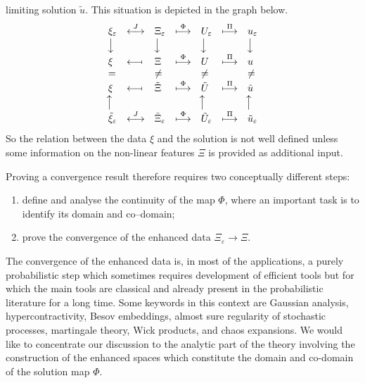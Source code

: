 \documentclass[a4paper, 11pt]{article}
\newcommand{\longdownarrow}{{\mbox{\rotatebox[origin=c]{-90}{$\longrightarrow$}}}}
\newcommand{\longuparrow}{{\mbox{\rotatebox[origin=c]{90}{$\longrightarrow$}}}}
\begin{document}
limiting solution $\tilde{u}$. This situation is depicted in the graph below.
\[ \begin{array}{lllllll}
     \xi_{\varepsilon} & \overset{J}{\longleftrightarrow} & \Xi_{\varepsilon}
     & \overset{\Phi}{\longmapsto} & U_{\varepsilon} & \overset{\Pi}{\longmapsto} &
     u_{\varepsilon}\\
     \longdownarrow &  & \longdownarrow &  & \longdownarrow &  &
     \longdownarrow\\
     \xi & \longmapsfrom & \Xi & \overset{\Phi}{\longmapsto} & U & \overset{\Pi}{\longmapsto}
     & u\\
     = &  & \neq &  & \neq &  & \neq\\
     \xi & \longmapsfrom & \tilde{\Xi} & \overset{\Phi}{\longmapsto} &
     \tilde{U} & \overset{\Pi}{\longmapsto} & \tilde{u}\\
     \longuparrow &  &  &  & \longuparrow &  & \longuparrow\\
     \tilde{\xi}_{\varepsilon} & \overset{J}{\longleftrightarrow} &
     \tilde{\Xi}_{\varepsilon} & \overset{\Phi}{\longmapsto} &
     \tilde{U}_{\varepsilon} & \overset{\Pi}{\longmapsto} & \tilde{u}_{\varepsilon}
   \end{array} \]
So the relation between the data $\xi$ and the solution is not well defined
unless some information on the non-linear features $\Xi$ is provided as
additional input.

Proving a convergence result therefore requires two conceptually different
steps:
\begin{enumerate}
  \item define and analyse the continuity of the map $\Phi$, where an
  important task is to identify its domain and co--domain;
  
  \item prove the convergence of the enhanced data $\Xi_{\varepsilon}
  \rightarrow \Xi$.
\end{enumerate}
The convergence of the enhanced data is, in most of the applications, a purely
probabilistic step which sometimes requires development of efficient tools but
for which the main tools are classical and already present in the
probabilistic literature for a long time. Some keywords in this context are
Gaussian analysis, hypercontractivity, Besov embeddings, almost sure
regularity of stochastic processes, martingale theory, Wick products, and
chaos expansions. We would like to concentrate our discussion to the analytic
part of the theory involving the construction of the enhanced spaces which
constitute the domain and co-domain of the solution map $\Phi$.
\end{document}
